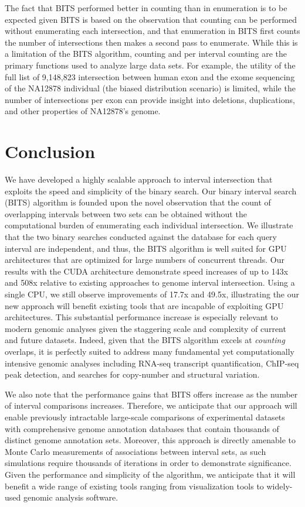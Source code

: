 \documentclass{bioinfo}
\begin{document}
		The fact that BITS performed better in counting than in enumeration is to be
		expected given BITS is based on the observation that counting can be
		performed without enumerating each intersection, and that enumeration in BITS
		first counts the number of intersections then makes a second pass to enumerate.
		While this is a limitation of the BITS algorithm, counting and per interval
		counting are the primary functions used to analyze large data sets.  For
		example, the utility of the full list of 9,148,823 intersection between human
		exon and the exome sequencing of the NA12878 individual (the biased distribution
		scenario) is limited, while the number of intersections per exon can provide
		insight into deletions, duplications, and other properties of NA12878's
		genome.

		\section{Conclusion}
		We have developed a highly scalable approach to interval intersection
		that exploits the speed and simplicity of the binary search. Our 
		binary interval search (BITS) algorithm is founded upon the novel 
		observation that the count of overlapping intervals between two sets 
		can be obtained without the computational burden of enumerating each individual
		intersection. We illustrate that the two binary searches conducted
		against the database for each query interval are independent, and thus, the
		BITS algorithm is well suited for GPU architectures that are optimized for
		large numbers of concurrent threads. Our results with the CUDA architecture
		demonstrate speed increases of up to 143x and 508x relative to existing 
		approaches to genome interval intersection. Using a single CPU, we still observe
		improvements of 17.7x and 49.5x, illustrating the our new approach will benefit
		existing tools that are incapable of exploiting GPU architectures.  This
		substantial performance increase is especially relevant to modern genomic
		analyses given the staggering scale and complexity of current and future
		datasets.  Indeed, given that the BITS algorithm excels at \emph{counting}
		overlaps, it is perfectly suited to address many fundamental yet computationally
		intensive genomic analyses including RNA-seq transcript quantification, ChIP-seq
		peak detection, and searches for copy-number and structural variation.

		We also note that the performance gains that BITS offers increase as the number
		of interval comparisons increases. Therefore, we anticipate that our approach
		will enable previously intractable large-scale comparisons of experimental
		datasets with comprehensive genome annotation databases that contain thousands
		of distinct genome annotation sets. Moreover, this approach is directly amenable
		to Monte Carlo measurements of associations between interval sets, as such
		simulations require thousands of iterations in order to demonstrate
		significance. Given the performance and simplicity of the algorithm, we
		anticipate that it will benefit a wide range of existing tools ranging from
		visualization tools to widely-used genomic analysis software.

		
		
	
\end{document}
